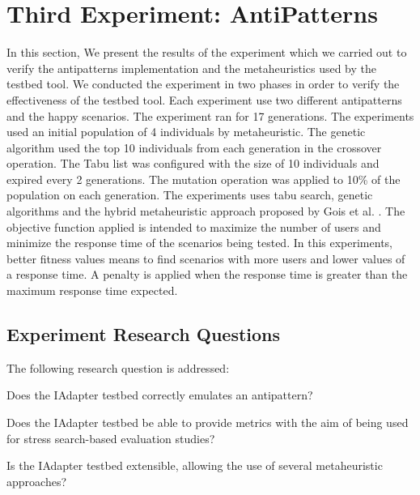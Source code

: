 \documentclass{report}
\begin{document}

\section{Third Experiment: AntiPatterns}

In this section, We present the results of the experiment which we carried out to verify the antipatterns  implementation and the metaheuristics used by the testbed tool. We conducted the experiment in two phases in order to verify the effectiveness of the testbed tool. Each experiment use two different antipatterns and the happy scenarios. The experiment ran for 17 generations. The experiments used an initial population of 4 individuals by metaheuristic. The genetic algorithm used the top 10 individuals from each generation in the crossover operation. The Tabu list was configured with the size of 10 individuals and expired every 2 generations.  The mutation operation was applied to 10\% of the population on each generation. The experiments uses tabu search, genetic algorithms and the hybrid metaheuristic approach proposed by Gois et al. \cite{Gois2016}. The objective function applied is intended to maximize the number of users and minimize the response time of the scenarios being tested.  In this experiments, better fitness values means to find scenarios with more users and lower values of a response time. A penalty is applied when the response time is greater than the  maximum response time expected. 

\subsection{Experiment Research Questions}

The following research question is addressed:
\begin{itemize*}
\item Does the IAdapter testbed correctly emulates an antipattern?
\item Does the IAdapter testbed be able to provide metrics with the aim of being used for stress search-based evaluation studies? 
\item Is the IAdapter testbed extensible, allowing the use of several metaheuristic approaches?
\end{itemize*}
\end{document}
